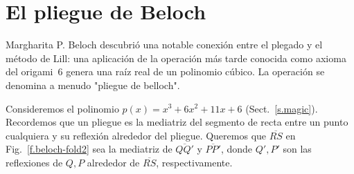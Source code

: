 \section{El pliegue de Beloch}\label{s.beloch-fold}

Margharita P. Beloch descubrió una notable conexión entre el plegado y el método de Lill: una aplicación de la operación más tarde conocida como axioma del origami~6 genera una raíz real de un polinomio cúbico. La operación se denomina a menudo "pliegue de belloch".

Consideremos el polinomio $p(x)=x^3+6x^2+11x+6$ (Sect.~\ref{s.magic}). Recordemos que un pliegue es la mediatriz del segmento de recta entre un punto cualquiera y su reflexión alrededor del pliegue. Queremos que $\overline{RS}$ en Fig.~\ref{f.beloch-fold2} sea la mediatriz de $\overline{QQ'}$ y $\overline{PP'}$, donde $Q',P'$ son las reflexiones de $Q,P$ alrededor de $\overline{RS}$, respectivamente.

